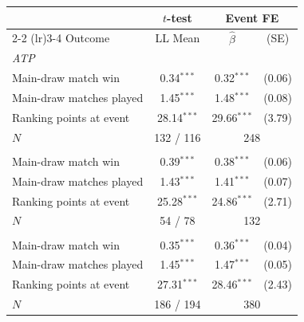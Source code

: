 \begin{tabular}{l ccc}
\toprule
 & $t$-test & \multicolumn{2}{c}{Event FE} \\
\cmidrule(lr){2-2} \cmidrule(lr){3-4}
Outcome & LL Mean & $\hat{\beta}$ & (SE) \\
\midrule
\multicolumn{5}{l}{\textit{ATP}} \\
\quad Main-draw match win & 0.34$^{***}$ & 0.32$^{***}$ & (0.06) \\
\quad Main-draw matches played & 1.45$^{***}$ & 1.48$^{***}$ & (0.08) \\
\quad Ranking points at event & 28.14$^{***}$ & 29.66$^{***}$ & (3.79) \\
\quad $N$ & \multicolumn{1}{c}{132 / 116} & \multicolumn{2}{c}{248} \\
\addlinespace
\multicolumn{5}{l}{\textit{WTA}} \\
\quad Main-draw match win & 0.39$^{***}$ & 0.38$^{***}$ & (0.06) \\
\quad Main-draw matches played & 1.43$^{***}$ & 1.41$^{***}$ & (0.07) \\
\quad Ranking points at event & 25.28$^{***}$ & 24.86$^{***}$ & (2.71) \\
\quad $N$ & \multicolumn{1}{c}{54 / 78} & \multicolumn{2}{c}{132} \\
\addlinespace
\multicolumn{5}{l}{\textit{Pooled}} \\
\quad Main-draw match win & 0.35$^{***}$ & 0.36$^{***}$ & (0.04) \\
\quad Main-draw matches played & 1.45$^{***}$ & 1.47$^{***}$ & (0.05) \\
\quad Ranking points at event & 27.31$^{***}$ & 28.46$^{***}$ & (2.43) \\
\quad $N$ & \multicolumn{1}{c}{186 / 194} & \multicolumn{2}{c}{380} \\
\bottomrule
\end{tabular}
